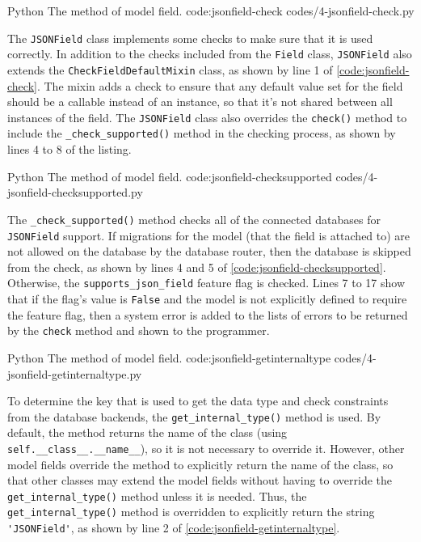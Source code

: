 \listing
{Python}
{The  method of  model field.}
{code:jsonfield-check}
{codes/4-jsonfield-check.py}

The \verb|JSONField| class implements some checks to make sure that it is
used correctly. In addition to the checks included from the \verb|Field| class,
\verb|JSONField| also extends the \verb|CheckFieldDefaultMixin| class, as shown
by line 1 of \autoref{code:jsonfield-check}. The mixin adds a check to ensure
that any default value set for the field should be a callable instead of an
instance, so that it's not shared between all instances of the field. The
\verb|JSONField| class also overrides the \verb|check()| method to include the
\verb|_check_supported()| method in the checking process, as shown by lines 4
to 8 of the listing.

\listing
{Python}
{The  method of  model field.}
{code:jsonfield-checksupported}
{codes/4-jsonfield-checksupported.py}

The \verb|_check_supported()| method checks all of the connected databases for
\verb|JSONField| support. If migrations for the model (that the field is
attached to) are not allowed on the database by the database router, then the
database is skipped from the check, as shown by lines 4 and 5 of
\autoref{code:jsonfield-checksupported}. Otherwise, the
\verb|supports_json_field| feature flag is checked. Lines 7 to 17 show that if
the flag's value is \verb|False| and the model is not explicitly defined to
require the feature flag, then a system error is added to the lists of errors
to be returned by the \verb|check| method and shown to the programmer.

\listing
{Python}
{The  method of  model field.}
{code:jsonfield-getinternaltype}
{codes/4-jsonfield-getinternaltype.py}

To determine the key that is used to get the data type and check constraints
from the database backends, the \verb|get_internal_type()| method is used. By
default, the method returns the name of the class (using
\verb|self.__class__.__name__|), so it is not necessary to override it.
However, other model fields override the method to explicitly return the name
of the class, so that other classes may extend the model fields without having
to override the \verb|get_internal_type()| method unless it is needed. Thus,
the \verb|get_internal_type()| method is overridden to explicitly return the
string \verb|'JSONField'|, as shown by line 2 of
\autoref{code:jsonfield-getinternaltype}.

